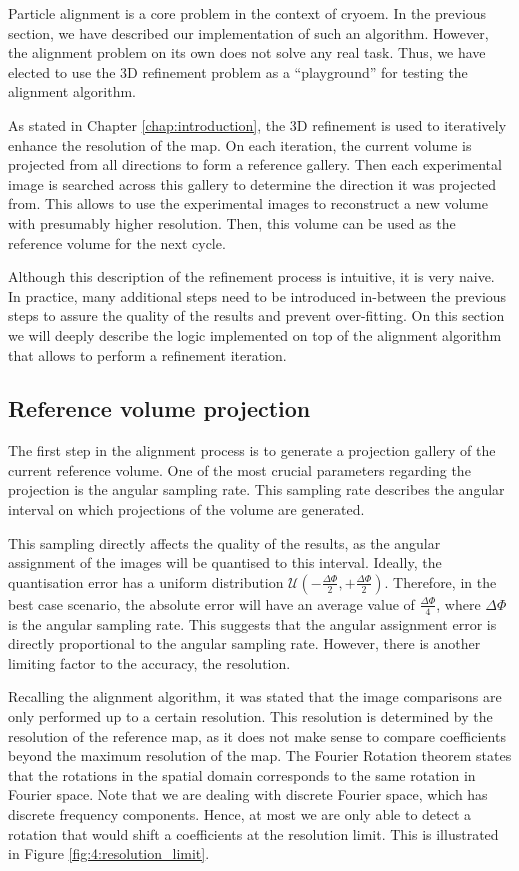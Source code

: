 \documentclass[../main.tex]{subfiles}
\begin{document}
Particle alignment is a core problem in the context of \gls{cryoem}. In the previous section, we have described our implementation of such an algorithm. However, the alignment problem on its own does not solve any real task. Thus, we have elected to use the 3D refinement problem as a ``playground'' for testing the alignment algorithm.

As stated in Chapter \ref{chap:introduction}, the 3D refinement is used to iteratively enhance the resolution of the map. On each iteration, the current volume is projected from all directions to form a reference gallery. Then each experimental image is searched across this gallery to determine the direction it was projected from. This allows to use the experimental images to reconstruct a new volume with presumably higher resolution. Then, this volume can be used as the reference volume for the next cycle.

Although this description of the refinement process is intuitive, it is very naive. In practice, many additional steps need to be introduced in-between the previous steps to assure the quality of the results and prevent over-fitting. On this section we will deeply describe the logic implemented on top of the alignment algorithm that allows to perform a refinement iteration.

\subsection{Reference volume projection}
The first step in the alignment process is to generate a projection gallery of the current reference volume. One of the most crucial parameters regarding the projection is the angular sampling rate. This sampling rate describes the angular interval on which projections of the volume are generated. 

This sampling directly affects the quality of the results, as the angular assignment of the images will be quantised to this interval. Ideally, the quantisation error has a uniform distribution $\mathcal{U}(-\frac{\Delta\Phi}{2}, +\frac{\Delta\Phi}{2})$. Therefore, in the best case scenario, the absolute error will have an average value of $\frac{\Delta\Phi}{4}$, where $\Delta\Phi$ is the angular sampling rate. This suggests that the angular assignment error is directly proportional to the angular sampling rate. However, there is another limiting factor to the accuracy, the resolution. 

Recalling the alignment algorithm, it was stated that the image comparisons are only performed up to a certain resolution. This resolution is determined by the resolution of the reference map, as it does not make sense to compare coefficients beyond the maximum resolution of the map. The Fourier Rotation theorem states that the rotations in the spatial domain corresponds to the same rotation in Fourier space. Note that we are dealing with discrete Fourier space, which has discrete frequency components.  Hence, at most we are only able to detect a rotation that would shift a coefficients at the resolution limit. This is illustrated in Figure \ref{fig:4:resolution_limit}.
\end{document}
